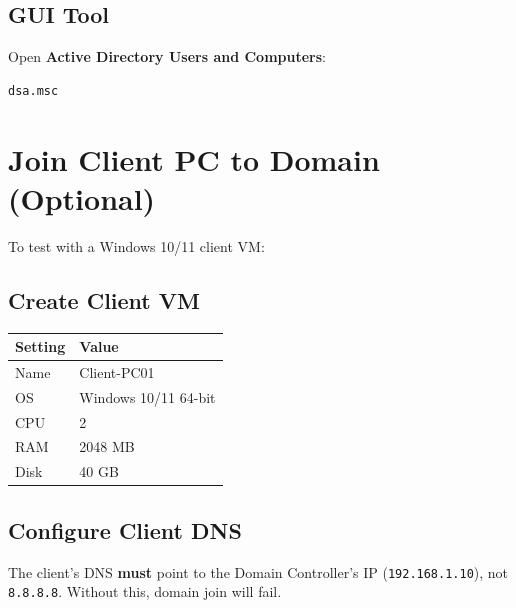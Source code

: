 ﻿\documentclass[12pt,a4paper]{article}
\begin{document}
\subsection{GUI Tool}

Open \textbf{Active Directory Users and Computers}:

\begin{lstlisting}
dsa.msc
\end{lstlisting}

\section{Join Client PC to Domain (Optional)}

To test with a Windows 10/11 client VM:

\subsection{Create Client VM}

\begin{table}[H]
\centering
\begin{tabularx}{0.5\textwidth}{l X}
\toprule
\textbf{Setting} & \textbf{Value} \\
\midrule
Name    & Client-PC01 \\
OS      & Windows 10/11 64-bit \\
CPU     & 2 \\
RAM     & 2048 MB \\
Disk    & 40 GB \\
\bottomrule
\end{tabularx}
\end{table}

\subsection{Configure Client DNS}

\begin{warningbox}
The client's DNS \textbf{must} point to the Domain Controller's IP (\texttt{192.168.1.10}), not \texttt{8.8.8.8}. Without this, domain join will fail.
\end{warningbox}
\end{document}
